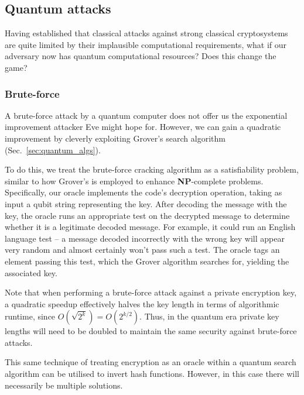 %
%

\subsection{Quantum attacks}

Having established that classical attacks against strong classical cryptosystems are quite limited by their implausible computational requirements, what if our adversary now has quantum computational resources? Does this change the game?

%
%

\subsubsection{Brute-force}\label{sec:brute_force_attacks}

A brute-force attack by a quantum computer does not offer us the exponential improvement attacker Eve might hope for. However, we can gain a quadratic improvement by cleverly exploiting Grover's search algorithm (Sec.~\ref{sec:quantum_algs}).

To do this, we treat the brute-force cracking algorithm as a satisfiability problem, similar to how Grover's is employed to enhance \textbf{NP}-complete problems. Specifically, our oracle implements the code's decryption operation, taking as input a qubit string representing the key. After decoding the message with the key, the oracle runs an appropriate test on the decrypted message to determine whether it is a legitimate decoded message. For example, it could run an English language test -- a message decoded incorrectly with the wrong key will appear very random and almost certainly won't pass such a test. The oracle tags an element passing this test, which the Grover algorithm searches for, yielding the associated key.

Note that when performing a brute-force attack against a private encryption key, a quadratic speedup effectively halves the key length in terms of algorithmic runtime, since \mbox{$O(\sqrt{2^k}) = O(2^{k/2})$}. Thus, in the quantum era private key lengths will need to be doubled to maintain the same security against brute-force attacks.

This same technique of treating encryption as an oracle within a quantum search algorithm can be utilised to invert hash functions. However, in this case there will necessarily be multiple solutions.

